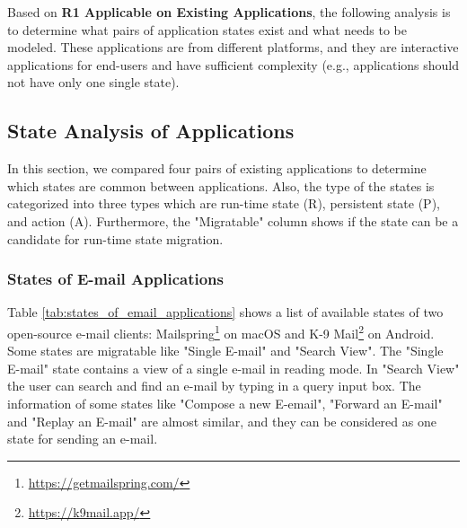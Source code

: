 Based on \textbf{R1 Applicable on Existing Applications}, the following analysis is to determine what pairs of application states exist and what needs to be modeled.
These applications are from different platforms, and they are interactive applications for end-users and have sufficient complexity (e.g., applications should not have only one single state).

\subsection{State Analysis of Applications}
In this section, we compared four pairs of existing applications to determine which states are common between applications. Also, the type of the states is categorized into three types which are run-time state (R), persistent state (P), and action (A). Furthermore, the "Migratable" column shows if the state can be a candidate for run-time state migration.

\subsubsection{States of E-mail Applications}

Table \ref{tab:states_of_email_applications} shows a list of available states of two open-source e-mail clients: Mailspring\footnote{\url{https://getmailspring.com/}} on macOS and K-9 Mail\footnote{\url{https://k9mail.app/}} on Android. Some states are migratable like "Single E-mail" and "Search View". The "Single E-mail" state contains a view of a single e-mail in reading mode. In "Search View" the user can search and find an e-mail by typing in a query input box. The information of some states like "Compose a new E-email", "Forward an E-mail" and "Replay an E-mail" are almost similar, and they can be considered as one state for sending an e-mail.

